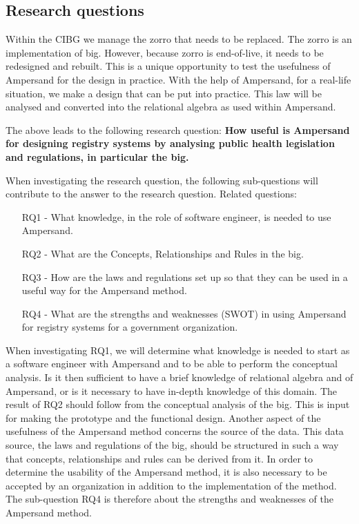\subsection{Research questions} \label{research_questions}

\begin{comment}
Onderzoeksvraag:
Hoe bruikbaar is Ampersand voor het ontwerpen van register-systemen door middel van het analyseren van wet- en regelgeving in de volksgezondheid en in het bijzonder de Wet-BIG
\end{comment}
Within the CIBG we manage the \acrshort{zorro} that needs to be replaced.
The \acrshort{zorro} is an implementation of \acrshort{big}.
However, because \acrshort{zorro} is end-of-live, it needs to be redesigned and rebuilt.
This is a unique opportunity to test the usefulness of Ampersand for the design in practice.
With the help of Ampersand, for a real-life situation, we make a design that can be put into practice.
This law will be analysed and converted into the relational algebra as used within Ampersand.

The above leads to the following research question:
\newline
\textbf{How useful is Ampersand for designing registry systems by analysing public health legislation and regulations, in particular the \acrshort{big}.}

When investigating the research question, the following sub-questions will contribute to the answer to the research question.
\newline Related questions:
\begin{enumerate}
\item[RQ1]- What knowledge, in the role of software engineer, is needed to use Ampersand.
\item[RQ2]- What are the Concepts, Relationships and Rules in the \acrshort{big}.
\item[RQ3]- How are the laws and regulations set up so that they can be used in a useful way for the Ampersand method.
\item[RQ4]- What are the strengths and weaknesses (SWOT) in using Ampersand for registry systems for a government organization.
\end{enumerate}

When investigating RQ1, we will determine what knowledge is needed to start as a software engineer with Ampersand and to be able to perform the conceptual analysis.
Is it then sufficient to have a brief knowledge of relational algebra and of Ampersand, or is it necessary to have in-depth knowledge of this domain.
The result of RQ2 should follow from the conceptual analysis of the \acrshort{big}.
This is input for making the prototype and the functional design.
Another aspect of the usefulness of the Ampersand method concerns the source of the data.
This data source, the laws and regulations of the \acrshort{big}, should be structured in such a way that concepts, relationships and rules can be derived from it.
In order to determine the usability of the Ampersand method, it is also necessary to be accepted by an organization in addition to the implementation of the method.
The sub-question RQ4 is therefore about the strengths and weaknesses of the Ampersand method.

